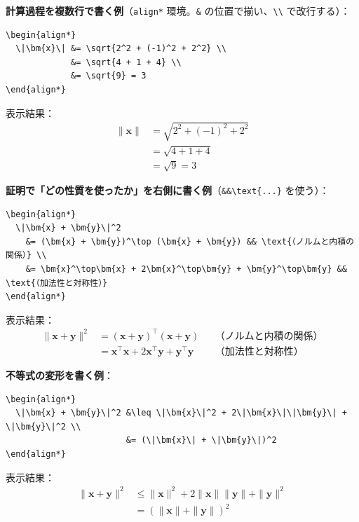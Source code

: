 \documentclass[a4paper,dvipdfmx]{jsarticle}
\newcommand{\学籍番号}{0000000}
\newcommand{\氏名}{氏名を書く}
\newcommand{\提出日}{2026年10月8日}
\begin{document}
\noindent
\textbf{計算過程を複数行で書く例}（\verb|align*| 環境。\verb|&| の位置で揃い、\verb|\\| で改行する）：
\begin{verbatim}
\begin{align*}
  \|\bm{x}\| &= \sqrt{2^2 + (-1)^2 + 2^2} \\
             &= \sqrt{4 + 1 + 4} \\
             &= \sqrt{9} = 3
\end{align*}
\end{verbatim}
表示結果：
\begin{align*}
  \|\bm{x}\| &= \sqrt{2^2 + (-1)^2 + 2^2} \\
             &= \sqrt{4 + 1 + 4} \\
             &= \sqrt{9} = 3
\end{align*}

\noindent
\textbf{証明で「どの性質を使ったか」を右側に書く例}（\verb|&&\text{...}| を使う）：
\begin{verbatim}
\begin{align*}
  \|\bm{x} + \bm{y}\|^2
    &= (\bm{x} + \bm{y})^\top (\bm{x} + \bm{y}) && \text{（ノルムと内積の関係）} \\
    &= \bm{x}^\top\bm{x} + 2\bm{x}^\top\bm{y} + \bm{y}^\top\bm{y} && \text{（加法性と対称性）}
\end{align*}
\end{verbatim}
表示結果：
\begin{align*}
  \|\bm{x} + \bm{y}\|^2
    &= (\bm{x} + \bm{y})^\top (\bm{x} + \bm{y}) && \text{（ノルムと内積の関係）} \\
    &= \bm{x}^\top\bm{x} + 2\bm{x}^\top\bm{y} + \bm{y}^\top\bm{y} && \text{（加法性と対称性）}
\end{align*}

\noindent
\textbf{不等式の変形を書く例}：
\begin{verbatim}
\begin{align*}
  \|\bm{x} + \bm{y}\|^2 &\leq \|\bm{x}\|^2 + 2\|\bm{x}\|\|\bm{y}\| + \|\bm{y}\|^2 \\
                        &= (\|\bm{x}\| + \|\bm{y}\|)^2
\end{align*}
\end{verbatim}
表示結果：
\begin{align*}
  \|\bm{x} + \bm{y}\|^2 &\leq \|\bm{x}\|^2 + 2\|\bm{x}\|\|\bm{y}\| + \|\bm{y}\|^2 \\
                        &= (\|\bm{x}\| + \|\bm{y}\|)^2
\end{align*}
\end{document}
